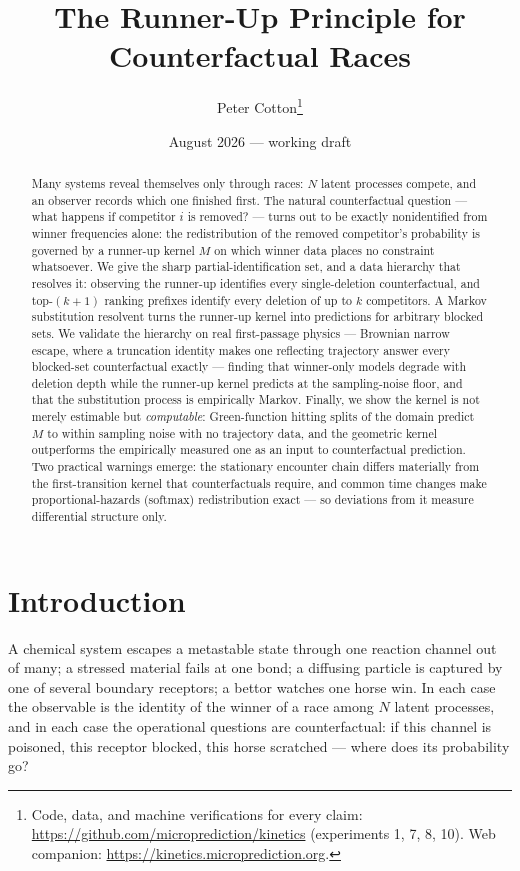 \documentclass[11pt]{article}
\title{The Runner-Up Principle for Counterfactual Races}
\author{Peter Cotton\thanks{Code, data, and machine verifications for every claim:
\url{https://github.com/microprediction/kinetics} (experiments 1, 7, 8, 10).
Web companion: \url{https://kinetics.microprediction.org}.}}
\date{August 2026 --- working draft}
\theoremstyle{remark}
\begin{document}
\maketitle

\begin{abstract}
Many systems reveal themselves only through races: $N$ latent processes compete, and
an observer records which one finished first. The natural counterfactual question ---
what happens if competitor $i$ is removed? --- turns out to be exactly nonidentified
from winner frequencies alone: the redistribution of the removed competitor's
probability is governed by a runner-up kernel $M$ on which winner data places no
constraint whatsoever. We give the sharp partial-identification set, and a data
hierarchy that resolves it: observing the runner-up identifies every single-deletion
counterfactual, and top-$(k{+}1)$ ranking prefixes identify every deletion of up to
$k$ competitors. A Markov substitution resolvent turns the runner-up kernel into
predictions for arbitrary blocked sets. We validate the hierarchy on real
first-passage physics --- Brownian narrow escape, where a truncation identity makes
one reflecting trajectory answer every blocked-set counterfactual exactly --- finding
that winner-only models degrade with deletion depth while the runner-up kernel
predicts at the sampling-noise floor, and that the substitution process is
empirically Markov. Finally, we show the kernel is not merely estimable but
\emph{computable}: Green-function hitting splits of the domain predict $M$ to within
sampling noise with no trajectory data, and the geometric kernel outperforms the
empirically measured one as an input to counterfactual prediction. Two practical
warnings emerge: the stationary encounter chain differs materially from the
first-transition kernel that counterfactuals require, and common time changes make
proportional-hazards (softmax) redistribution exact --- so deviations from it
measure differential structure only.
\end{abstract}

\section{Introduction}

A chemical system escapes a metastable state through one reaction channel out of
many; a stressed material fails at one bond; a diffusing particle is captured by one
of several boundary receptors; a bettor watches one horse win. In each case the
observable is the identity of the winner of a race among $N$ latent processes, and
in each case the operational questions are counterfactual: if this channel is
poisoned, this receptor blocked, this horse scratched --- where does its probability
go?
\end{document}
